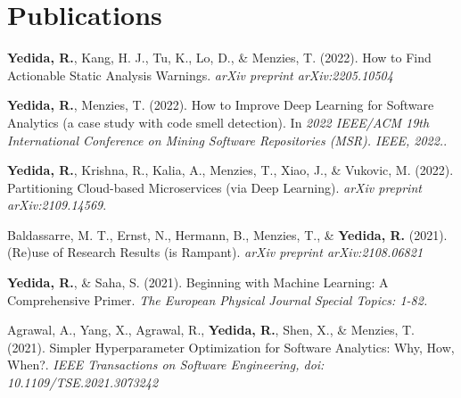 \section{Publications}
 \resumeSubHeadingListStart
    \item
      {\textbf{Yedida, R.}, Kang, H. J., Tu, K., Lo, D., \& Menzies, T. (2022). How to Find Actionable Static Analysis Warnings. \textit{arXiv preprint arXiv:2205.10504}}
    \item
      {\textbf{Yedida, R.}, Menzies, T. (2022). How to Improve Deep Learning for Software Analytics (a case study with code smell detection). In \textit{2022 IEEE/ACM 19th International Conference on Mining Software Repositories (MSR). IEEE, 2022.}}.
    \item
      {\textbf{Yedida, R.}, Krishna, R., Kalia, A., Menzies, T., Xiao, J., \& Vukovic, M. (2022). Partitioning   Cloud-based Microservices (via  Deep Learning). \textit{arXiv preprint arXiv:2109.14569}}.
    \item
      {Baldassarre, M. T., Ernst, N., Hermann, B., Menzies, T., \& \textbf{Yedida, R.} (2021). (Re)use of Research Results (is Rampant). \textit{arXiv preprint arXiv:2108.06821} 
      }
    \item
      {\textbf{Yedida, R.}, \& Saha, S. (2021). Beginning with Machine Learning: A Comprehensive Primer. \textit{The European Physical Journal Special Topics: 1-82.}}
    \item
      {Agrawal, A., Yang, X., Agrawal, R., \textbf{Yedida, R.}, Shen, X., \& Menzies, T. (2021). Simpler Hyperparameter Optimization for Software Analytics: Why, How, When?. \textit{IEEE Transactions on Software Engineering, doi: 10.1109/TSE.2021.3073242}}
